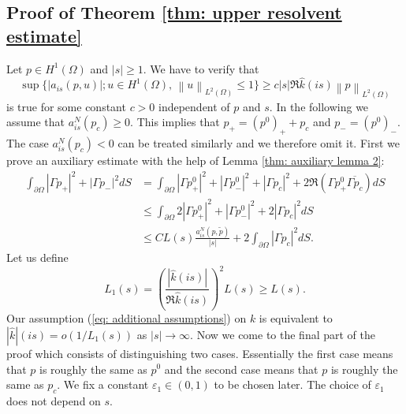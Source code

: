 \documentclass{amsart}
\newcommand{\abs}[1]{\left|#1\right|}
\newcommand{\norm}[1]{\left\| #1 \right\|}
\newcommand{\khat}{\hat{k}}
\newcommand{\ptilde}{\tilde{p}}
\begin{document}
\subsection{Proof of Theorem \ref{thm: upper resolvent estimate}}
Let $p\in H^1(\Omega)$ and $\abs{s}\geq 1$. We have to verify that 
\begin{equation}\nonumber
 \sup \{\abs{a_{is}(p,u)}; u\in H^1(\Omega),\, \norm{u}_{L^2(\Omega)}\leq 1\}\geq c\abs{s}\Re\khat(is)\norm{p}_{L^2(\Omega)}
\end{equation}
is true for some constant $c>0$ independent of $p$ and $s$. In the following we assume that $a^N_{is}(p_c)\geq 0$. This implies that $p_+=(p^0)_+ + p_c$ and $p_-=(p^0)_-$. The case $a^N_{is}(p_c)<0$ can be treated similarly and we therefore omit it. First we prove an auxiliary estimate with the help of Lemma \ref{thm: auxiliary lemma 2}:
\begin{align}\nonumber
 \int_{\partial\Omega} \abs{\Gamma p_+}^2 + \abs{\Gamma p_-}^2 dS &= \int_{\partial\Omega} \abs{\Gamma p_+^0}^2 + \abs{\Gamma p_-^0}^2 + \abs{\Gamma p_c}^2 + 2\Re (\Gamma p_+^0 \overline{\Gamma p_c}) dS \\
 \nonumber
 &\leq \int_{\partial\Omega} 2\abs{\Gamma p_+^0}^2 + \abs{\Gamma p_-^0}^2 + 2\abs{\Gamma p_c}^2 dS \\
 \label{eq: auxiliary estimate in main proof}
 &\leq CL(s)\frac{a^N_{is}(p,\ptilde)}{\abs{s}} + 2\int_{\partial\Omega} \abs{\Gamma p_c}^2 dS.
\end{align}
Let us define
\begin{equation}\nonumber
 L_1(s) = \left(\frac{\abs{\khat(is)}}{\Re\khat(is)}\right)^2 L(s) \geq L(s) .
\end{equation}
Our assumption (\ref{eq: additional assumptions}) on $k$ is equivalent to $|\khat|(is)=o(1/L_1(s))$ as $\abs{s}\rightarrow\infty$. Now we come to the final part of the proof which consists of distinguishing two cases. Essentially the first case means that $p$ is roughly the same as $p^0$ and the second case means that $p$ is roughly the same as $p_c$. We fix a constant $\varepsilon_1\in(0,1)$ to be chosen later. The choice of $\varepsilon_1$ does not depend on $s$.
\end{document}
